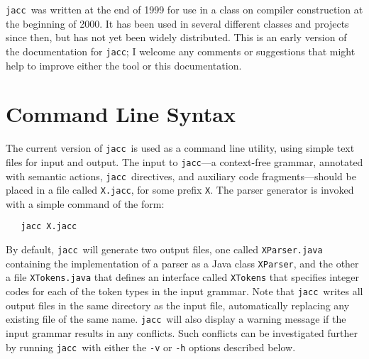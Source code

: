 \documentclass[12pt]{article}
\def\jacc{{\tt jacc}}
\begin{document}
\jacc\ was written at the end of 1999 for use in a class on
compiler construction at the beginning of 2000.  It has been used
in several different classes and projects since then, but has not
yet been widely distributed.  This is an early version of the
documentation for \jacc; I welcome any comments or suggestions
that might help to improve either the tool or this documentation.

\section{Command Line Syntax}
The current version of \jacc\ is used as a command line utility,
using simple text files for input and output.  The input to
\jacc---a context-free grammar, annotated with semantic actions,
\jacc\ directives, and auxiliary code fragments---should be
placed in a file called \verb"X.jacc", for some prefix \verb"X".
The parser generator is invoked with a simple command
of the form:
\begin{verbatim}
   jacc X.jacc
\end{verbatim}
By default, \jacc\ will generate two output files, one
called \verb"XParser.java" containing the implementation
of a parser as a Java class \verb"XParser", and the other a
file \verb"XTokens.java" that defines an interface called
\verb"XTokens" that specifies integer codes for each of the
token types in the input grammar.  Note that \jacc\ writes
all output files in the same directory as the input file,
automatically replacing any existing file of the same name.
\jacc\ will also display a warning message if the input
grammar results in any conflicts.  Such conflicts can be
investigated further by running \jacc\ with either the
\verb"-v" or \verb"-h" options described below.
\end{document}
